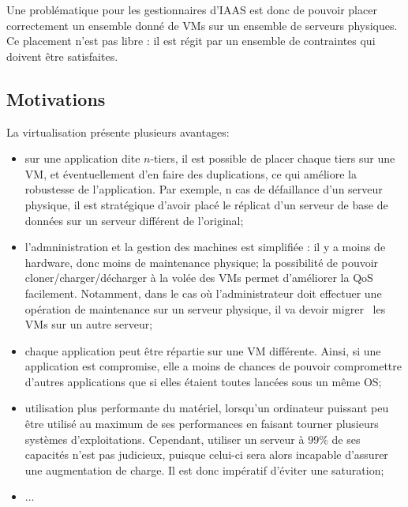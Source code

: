 \documentclass[a4paper]{article}
\begin{document}
Une problématique pour les gestionnaires d'IAAS est donc de pouvoir placer
correctement un ensemble donné de VMs sur un ensemble de serveurs physiques.
Ce placement n'est pas libre : il est régit par un ensemble de contraintes
qui doivent être satisfaites.

\subsection{Motivations}
La virtualisation présente plusieurs avantages:
\begin{itemize}
	\item sur une application dite $n$-tiers, il est possible
	de placer chaque tiers sur une VM, et éventuellement d'en faire
	des duplications, ce qui améliore la robustesse de l'application.
	Par exemple, n cas de défaillance d'un serveur physique, il est
	stratégique d'avoir placé le réplicat d'un serveur de base de
	données sur un serveur différent de l'original;
	\item l'admninistration et la gestion des machines est simplifiée :
	il y a moins de hardware, donc moins de maintenance physique;
	la possibilité de pouvoir cloner/charger/décharger à la volée des
	VMs permet d'améliorer la QoS facilement. Notamment, dans le cas
	où l'administrateur doit effectuer une opération de maintenance sur
	un serveur physique, il va devoir migrer~\cite{clark2005live} les VMs
	sur un autre serveur;
	\item chaque application peut être répartie sur une VM différente.
	Ainsi, si une application est compromise, elle a moins de chances
	de pouvoir compromettre d'autres applications que si elles étaient
	toutes lancées sous un même OS;
	\item utilisation plus performante du matériel, lorsqu'un ordinateur
	puissant peu être utilisé au maximum de ses performances en faisant
	tourner plusieurs systèmes d'exploitations. Cependant, utiliser un
	serveur à $99\%$ de ses capacités n'est pas judicieux, puisque celui-ci
	sera alors incapable d'assurer une augmentation de charge. Il est donc
	impératif d'éviter une saturation;
	\item $\ldots$
\end{itemize}

\end{document}
